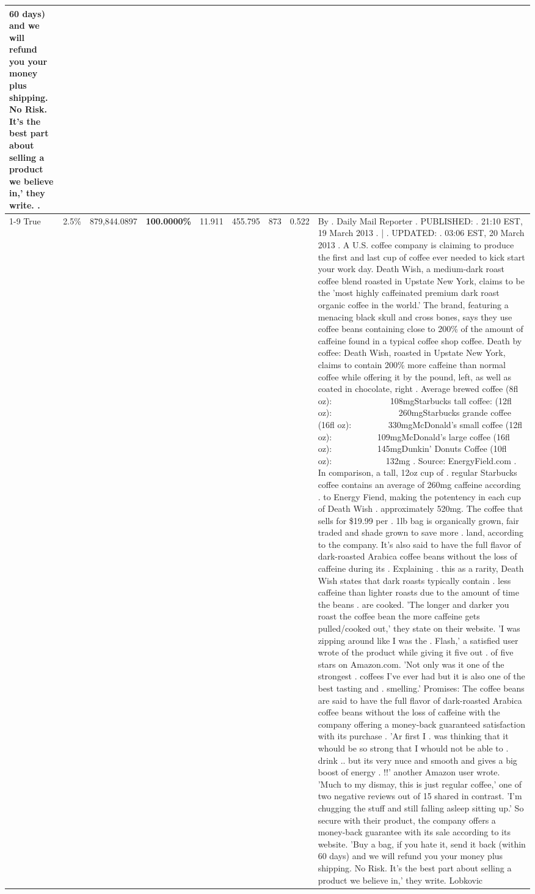 \begin{table}[H]
{\begin{tabular}{lllrlllll}
60 days) and we will refund you your money plus shipping. No Risk. It’s the best part about selling a product we believe in,' they write. . \\
\cline{1-9}
True & 2.5\% & 879,844.0897 & \bfseries \color{red} 100.0000\% & 11.911 & 455.795 & 873 & 0.522 & By . Daily Mail Reporter . PUBLISHED: . 21:10 EST, 19 March 2013 . | . UPDATED: . 03:06 EST, 20 March 2013 . A U.S. coffee company is claiming to produce the first and last cup of coffee ever needed to kick start your work day. Death Wish, a medium-dark roast coffee blend roasted in Upstate New York, claims to be the 'most highly caffeinated premium dark roast organic coffee in the world.' The brand, featuring a menacing black skull and cross bones, says they use coffee beans containing close to 200\% of the amount of caffeine found in a typical coffee shop coffee. Death by coffee: Death Wish, roasted in Upstate New York, claims to contain 200\% more caffeine than normal coffee while offering it by the pound, left, as well as coated in chocolate, right . Average brewed coffee (8fl oz):              108mgStarbucks tall coffee: (12fl oz):                260mgStarbucks grande coffee (16fl oz):         330mgMcDonald's small coffee (12fl oz):           109mgMcDonald's large coffee (16fl oz):           145mgDunkin' Donuts Coffee (10fl oz):             132mg . Source: EnergyField.com . In comparison, a tall, 12oz cup of . regular Starbucks coffee contains an average of 260mg caffeine according . to Energy Fiend, making the potentency in each cup of Death Wish . approximately 520mg. The coffee that sells for \$19.99 per . 1lb bag is organically grown, fair traded and shade grown to save more . land, according to the company. It's also said to have the full flavor of dark-roasted Arabica coffee beans without the loss of caffeine during its . Explaining . this as a rarity, Death Wish states that dark roasts typically contain . less caffeine than lighter roasts due to the amount of time the beans . are cooked. 'The longer and darker you roast the coffee bean the more caffeine gets pulled/cooked out,' they state on their website. 'I was zipping around like I was the . Flash,' a satisfied user wrote of the product while giving it five out . of five stars on Amazon.com. 'Not only was it one of the strongest . coffees I've ever had but it is also one of the best tasting and . smelling.’ Promises: The coffee beans are said to have the full flavor of dark-roasted Arabica coffee beans without the loss of caffeine with the company offering a money-back guaranteed satisfaction with its purchase . 'Ar first I . was thinking that it whould be so strong that I whould not be able to . drink .. but its very nuce and smooth and gives a big boost of energy . !!' another Amazon user wrote. 'Much to my dismay, this is just regular coffee,' one of two negative reviews out of 15 shared in contrast. 'I'm chugging the stuff and still falling asleep sitting up.' So secure with their product, the company offers a money-back guarantee with its sale according to its website. 'Buy a bag, if you hate it, send it back (within 60 days) and we will refund you your money plus shipping. No Risk. It’s the best part about selling a product we believe in,' they write. Lobkovic \\

\end{tabular}}
\end{table}

